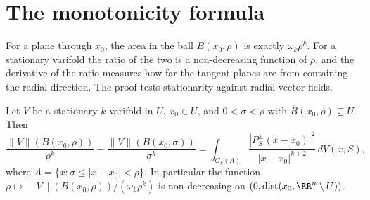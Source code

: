 \section{The monotonicity formula}\label{varifolds:section-monotonicity}

For a plane through $x_0$, the area in the ball $B(x_0, \rho)$ is exactly $\omega_k\rho^k$. For a stationary varifold the ratio of the two is a non-decreasing function of $\rho$, and the derivative of the ratio
measures how far the tangent planes are from containing the radial direction. The proof tests stationarity against radial vector fields.

\begin{theorem}\label{varifolds:theorem-monotonicity}
Let $V$ be a stationary $k$-varifold in $U$, $x_0 \in U$, and $0 < \sigma < \rho$ with $\overline{B}(x_0, \rho) \subseteq U$. Then
\[
\frac{\|V\|(B(x_0, \rho))}{\rho^k} - \frac{\|V\|(B(x_0, \sigma))}{\sigma^k} = \int_{G_k(A)}\frac{|P_S^\perp(x - x_0)|^2}{|x - x_0|^{k+2}}\,dV(x, S),
\]
where $A = \{x : \sigma \leq |x - x_0| < \rho\}$.
In particular the function $\rho \mapsto \|V\|(B(x_0, \rho))/(\omega_k\rho^k)$ is non-decreasing on $(0, \operatorname{dist}(x_0, \RR^n \setminus U))$.
\end{theorem}

